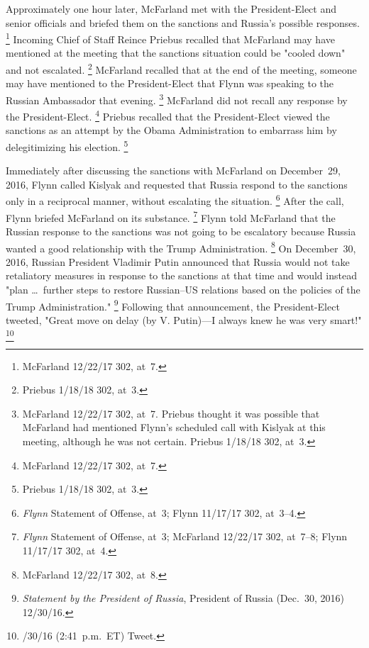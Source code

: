 Approximately one hour later, McFarland met with the President-Elect and senior officials and briefed them on the sanctions and Russia's possible responses.%
\footnote{McFarland 12/22/17 302, at~7.}
Incoming Chief of Staff Reince Priebus recalled that McFarland may have mentioned at the meeting that the sanctions situation could be "cooled down" and not escalated.%
\footnote{Priebus 1/18/18 302, at~3.}
McFarland recalled that at the end of the meeting, someone may have mentioned to the President-Elect that Flynn was speaking to the Russian Ambassador that evening.%
\footnote{McFarland 12/22/17 302, at~7.
Priebus thought it was possible that McFarland had mentioned Flynn's scheduled call with Kislyak at this meeting, although he was not certain.
Priebus 1/18/18 302, at~3.}
McFarland did not recall any response by the President-Elect.%
\footnote{McFarland 12/22/17 302, at~7.}
Priebus recalled that the President-Elect viewed the sanctions as an attempt by the Obama Administration to embarrass him by delegitimizing his election.%
\footnote{Priebus 1/18/18 302, at~3.}

Immediately after discussing the sanctions with McFarland on December~29, 2016, Flynn called Kislyak and requested that Russia respond to the sanctions only in a reciprocal manner, without escalating the situation.%
\footnote{\textit{Flynn} Statement of Offense, at~3;
Flynn 11/17/17 302, at~3--4.}
After the call, Flynn briefed McFarland on its substance.%
\footnote{\textit{Flynn} Statement of Offense, at~3;
McFarland 12/22/17 302, at~7--8;
Flynn 11/17/17 302, at~4.}
Flynn told McFarland that the Russian response to the sanctions was not going to be escalatory because Russia wanted a good relationship with the Trump Administration.%
\footnote{McFarland 12/22/17 302, at~8.}
On December~30, 2016, Russian President Vladimir Putin announced that Russia would not take retaliatory measures in response to the sanctions at that time and would instead "plan \dots\ further steps to restore Russian--US relations based on the policies of the Trump Administration."%
\footnote{\textit{Statement by the President of Russia}, President of Russia (Dec.~30, 2016) 12/30/16.}
Following that announcement, the President-Elect tweeted, "Great move on delay (by V. Putin)---I always knew he was very smart!"%
\footnote{/30/16 (2:41~p.m.~ET) Tweet.}

